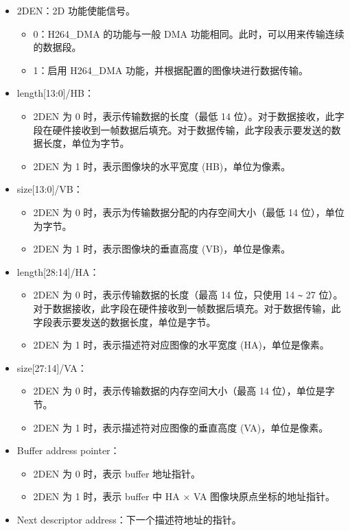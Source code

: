 \documentclass[main\_\_CN.tex]{subfiles}
\begin{document}
\begin{itemize}
\item 2DEN：2D 功能使能信号。
    \begin{itemize}
    \item 0：H264\_DMA 的功能与一般 DMA 功能相同。此时，可以用来传输连续的数据段。
    \item 1：启用 H264\_DMA 功能，并根据配置的图像块进行数据传输。
    \end{itemize}

\item length[13:0]/HB：
    \begin{itemize}
    \item 2DEN 为 0 时，表示传输数据的长度（最低 14 位）。对于数据接收，此字段在硬件接收到一帧数据后填充。对于数据传输，此字段表示要发送的数据长度，单位为字节。
    \item 2DEN 为 1 时，表示图像块的水平宽度 (HB)，单位为像素。
    \end{itemize}

\item size[13:0]/VB：
    \begin{itemize}
    \item 2DEN 为 0 时，表示为传输数据分配的内存空间大小（最低 14 位），单位为字节。
    \item 2DEN 为 1 时，表示图像块的垂直高度 (VB)，单位是像素。
    \end{itemize}
\item length[28:14]/HA：
    \begin{itemize}
    \item 2DEN 为 0 时，表示传输数据的长度（最高 14 位，只使用 14 \verb+~+ 27 位）。对于数据接收，此字段在硬件接收到一帧数据后填充。对于数据传输，此字段表示要发送的数据长度，单位是字节。
    \item 2DEN 为 1 时，表示描述符对应图像的水平宽度 (HA)，单位是像素。
    \end{itemize}
\item size[27:14]/VA：
    \begin{itemize}
    \item 2DEN 为 0 时，表示传输数据的内存空间大小（最高 14 位），单位是字节。
    \item 2DEN 为 1 时，表示描述符对应图像的垂直高度 (VA)，单位是像素。
    \end{itemize}
\item Buffer address pointer：
    \begin{itemize}
    \item 2DEN 为 0 时，表示 buffer 地址指针。
    \item 2DEN 为 1 时，表示 buffer 中 HA × VA 图像块原点坐标的地址指针。
    \end{itemize}
\item Next descriptor address：下一个描述符地址的指针。
\end{itemize}
\end{document}
